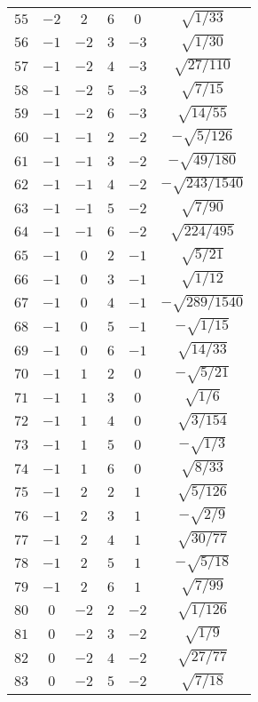 \begin{table}
\begin{center}
\begin{tabular}{|c|c|c|c|c|c|}
$55$ & $-2$ & $2$ & $6$ & $0$ & $\sqrt{1/33}$ \\ 
$56$ & $-1$ & $-2$ & $3$ & $-3$ & $\sqrt{1/30}$ \\ 
$57$ & $-1$ & $-2$ & $4$ & $-3$ & $\sqrt{27/110}$ \\ 
$58$ & $-1$ & $-2$ & $5$ & $-3$ & $\sqrt{7/15}$ \\ 
$59$ & $-1$ & $-2$ & $6$ & $-3$ & $\sqrt{14/55}$ \\ 
$60$ & $-1$ & $-1$ & $2$ & $-2$ & $-\sqrt{5/126}$ \\ 
$61$ & $-1$ & $-1$ & $3$ & $-2$ & $-\sqrt{49/180}$ \\ 
$62$ & $-1$ & $-1$ & $4$ & $-2$ & $-\sqrt{243/1540}$ \\ 
$63$ & $-1$ & $-1$ & $5$ & $-2$ & $\sqrt{7/90}$ \\ 
$64$ & $-1$ & $-1$ & $6$ & $-2$ & $\sqrt{224/495}$ \\ 
$65$ & $-1$ & $0$ & $2$ & $-1$ & $\sqrt{5/21}$ \\ 
$66$ & $-1$ & $0$ & $3$ & $-1$ & $\sqrt{1/12}$ \\ 
$67$ & $-1$ & $0$ & $4$ & $-1$ & $-\sqrt{289/1540}$ \\ 
$68$ & $-1$ & $0$ & $5$ & $-1$ & $-\sqrt{1/15}$ \\ 
$69$ & $-1$ & $0$ & $6$ & $-1$ & $\sqrt{14/33}$ \\ 
$70$ & $-1$ & $1$ & $2$ & $0$ & $-\sqrt{5/21}$ \\ 
$71$ & $-1$ & $1$ & $3$ & $0$ & $\sqrt{1/6}$ \\ 
$72$ & $-1$ & $1$ & $4$ & $0$ & $\sqrt{3/154}$ \\ 
$73$ & $-1$ & $1$ & $5$ & $0$ & $-\sqrt{1/3}$ \\ 
$74$ & $-1$ & $1$ & $6$ & $0$ & $\sqrt{8/33}$ \\ 
$75$ & $-1$ & $2$ & $2$ & $1$ & $\sqrt{5/126}$ \\ 
$76$ & $-1$ & $2$ & $3$ & $1$ & $-\sqrt{2/9}$ \\ 
$77$ & $-1$ & $2$ & $4$ & $1$ & $\sqrt{30/77}$ \\ 
$78$ & $-1$ & $2$ & $5$ & $1$ & $-\sqrt{5/18}$ \\ 
$79$ & $-1$ & $2$ & $6$ & $1$ & $\sqrt{7/99}$ \\ 
$80$ & $0$ & $-2$ & $2$ & $-2$ & $\sqrt{1/126}$ \\ 
$81$ & $0$ & $-2$ & $3$ & $-2$ & $\sqrt{1/9}$ \\ 
$82$ & $0$ & $-2$ & $4$ & $-2$ & $\sqrt{27/77}$ \\ 
$83$ & $0$ & $-2$ & $5$ & $-2$ & $\sqrt{7/18}$ \\ 

\end{tabular}
\end{center}
\end{table}
